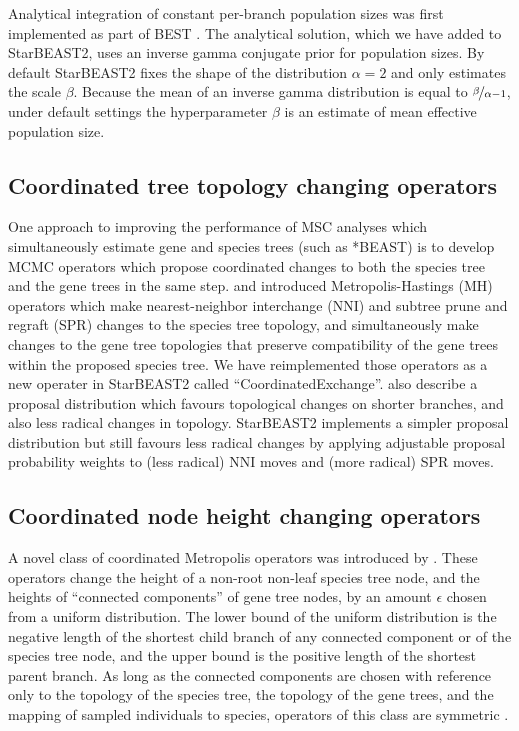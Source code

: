 \documentclass[12pt]{article}
\begin{document}
Analytical integration of constant per-branch population sizes was first
implemented as part of BEST \citep{EVO:EVO414}. The analytical solution, which
we have added to StarBEAST2, uses an inverse gamma conjugate prior for
population sizes. By default StarBEAST2 fixes the shape of the distribution
$\alpha = 2$ and only estimates the scale $\beta$. Because the mean of an
inverse gamma distribution is equal to $\nicefrac{\beta}{\alpha - 1}$, under default
settings the hyperparameter $\beta$ is an estimate of mean effective
population size.

\subsection*{Coordinated tree topology changing operators}

One approach to improving the performance of MSC analyses which simultaneously
estimate gene and species trees (such as *BEAST) is to develop MCMC operators
which propose coordinated changes to both the species tree and the gene trees in
the same step. \cite{Yang01122014} and \cite{2015arXiv151203843R} introduced
Metropolis-Hastings (MH) operators which make nearest-neighbor interchange (NNI) and subtree prune and regraft (SPR) changes to the species
tree topology, and simultaneously make changes to the gene tree topologies that
preserve compatibility of the gene trees within the proposed species tree. We have
reimplemented those operators as a new operater in StarBEAST2 called
``CoordinatedExchange''. \cite{2015arXiv151203843R} also describe a proposal
distribution which favours topological changes on shorter branches, and also
less radical changes in topology. StarBEAST2 implements a simpler proposal
distribution but still favours less radical changes by applying adjustable
proposal probability weights to (less radical) NNI moves and (more radical) SPR
moves.

\subsection*{Coordinated node height changing operators}

A novel class of coordinated Metropolis operators was introduced by
\cite{Jones010199}. These operators change the height of a non-root non-leaf
species tree node, and the heights of ``connected components'' of gene tree
nodes, by an amount $\epsilon$ chosen from a uniform distribution.
The lower bound of the uniform distribution is the negative length of
the shortest child branch of any connected component or of the species tree node,
and the upper bound is the positive length of the shortest parent branch. As
long as the connected components are chosen with reference only to the topology
of the species tree, the topology of the gene trees, and the mapping of
sampled individuals to species, operators of this class are symmetric
\citep{Jones010199}.
\end{document}
